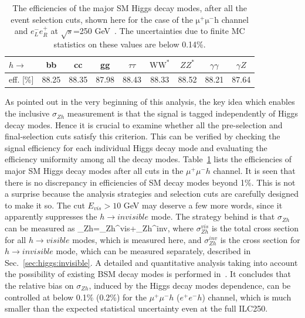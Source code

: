 \begin{table}[htb]
\centering
\begin{tabular}{l|c|c|c|c|c|c|c|c}
\hline
${h\to }$ & bb & cc & gg & $\tau\tau$ & $\mathrm{WW^{*}}$ & 
$ZZ^{*}$ & $\gamma\gamma$ & $\gamma Z$ \\
\hline
eff. [\%] & 88.25 & 88.35 & 87.98 & 88.43 & 88.33 & 88.52 & 88.21 & 87.64 \\
\hline
\end{tabular}
\caption{The efficiencies of the major SM Higgs decay modes,
after all the event selection cuts, shown here for the case 
of the $\mathrm{\mu^{+}\mu^{-}h}$
channel and $e_{L}^{-}e_{R}^{+}$ at $\sqrt{s}$=250 GeV~\cite{Yan:2016xyx}.
The uncertainties due to finite MC statistics on these values are below 0.14\%.}
\label{tab:recoilmass}
\end{table}

As pointed out in the very beginning of this analysis, the key idea which enables
the inclusive $\sigma_{Zh}$ measurement is that the signal is tagged
independently of Higgs decay modes. Hence it is crucial to examine whether all
the pre-selection and final-selection cuts satisfy this criterion. This can be verified 
by checking the signal efficiency for each individual Higgs decay mode
and evaluating the efficiency uniformity among all the decay modes.
Table~\ref{tab:recoilmass} lists the efficiencies of major SM Higgs decay modes 
after all cuts in the $\mu^+\mu^-h$ channel. It is seen that there is no
discrepancy in efficiencies of SM decay modes beyond 1\%. 
This is not a surprise because the analysis strategies and selection cuts
are carefully designed to make it so. The cut $E_{vis}>10$ GeV may
deserve a few more words, since it apparently suppresses the 
$h\to invisible$ mode. The strategy behind is that $\sigma_{Zh}$ can be
measured as 
\beq
\sigma_{Zh}=\sigma_{Zh}^{vis}+\sigma_{Zh}^{inv},
where $\sigma_{Zh}^{vis}$ is the total cross section for all $h\to visible$
modes, which is measured here, and $\sigma_{Zh}^{inv}$ is the cross section
for $h\to invisible$ mode, which can be measured separately, described in
Sec.~\ref{sec:higgs:invisible}. A detailed and quantitative analysis taking into 
account the possibility of existing BSM decay modes is performed in~\cite{Yan:2016xyx}.
It concludes that the relative bias on $\sigma_{Zh}$,
induced by the Higgs decay modes dependence, can be
controlled at below 0.1\% (0.2\%) for the $\mu^+\mu^-h$ ($e^+e^-h$) channel,
which is much smaller than the
expected statistical uncertainty even at the full ILC250.

